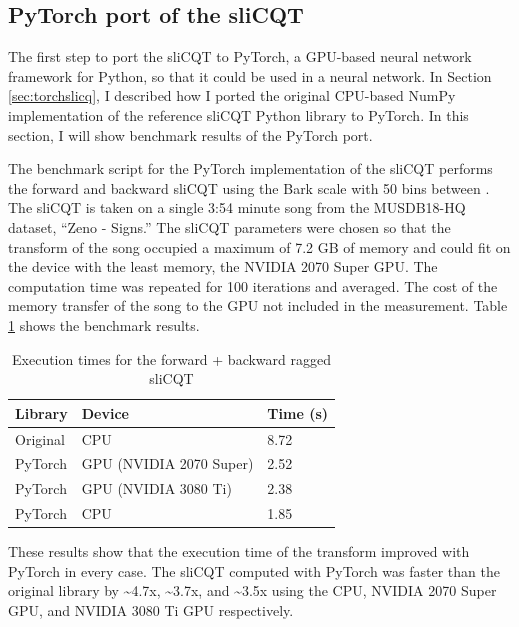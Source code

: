 \documentclass[report.tex]{subfiles}
\begin{document}
\subsection{PyTorch port of the sliCQT}
\label{sec:gpuexperimentpytorch}

The first step  to port the sliCQT to PyTorch, a GPU-based neural network framework for Python, so that it could be used in a neural network. In Section \ref{sec:torchslicq}, I described how I ported the original CPU-based NumPy implementation of the reference sliCQT Python library to PyTorch. In this section, I will show benchmark results of the PyTorch port.

The benchmark script for the PyTorch implementation of the sliCQT performs the forward and backward sliCQT using the Bark scale with 50 bins between . The sliCQT is taken on a single 3:54 minute song from the MUSDB18-HQ dataset, ``Zeno - Signs.'' The sliCQT parameters were chosen so that the transform of the song occupied a maximum of 7.2 GB of memory and could fit on the device with the least memory, the NVIDIA 2070 Super GPU. The computation time was repeated for 100 iterations and averaged. The cost of the memory transfer of the song to the GPU  not included in the measurement. Table \ref{table:nsgttorchresultsragged} shows the benchmark results.

\begin{table}[ht]
	\centering
	\caption{Execution times for the forward + backward ragged sliCQT}
	\label{table:nsgttorchresultsragged}
	\begin{tabular}{ |l|l|l| }
	 \hline
		Library & Device & Time (s) \\
	 \hline
	 \hline
		Original & CPU & 8.72 \\
	 \hline
		PyTorch & GPU (NVIDIA 2070 Super) & 2.52 \\
	 \hline
		PyTorch & GPU (NVIDIA 3080 Ti) & 2.38 \\
	 \hline
		PyTorch & CPU & 1.85 \\
	 \hline
\end{tabular}
\end{table}

\begin{shaded}

These results show that the execution time of the transform improved with PyTorch in every case. The sliCQT computed with PyTorch was faster than the original library by \textasciitilde4.7x, \textasciitilde3.7x, and \textasciitilde3.5x using the CPU, NVIDIA 2070 Super GPU, and NVIDIA 3080 Ti GPU respectively.

\end{shaded}
\end{document}
